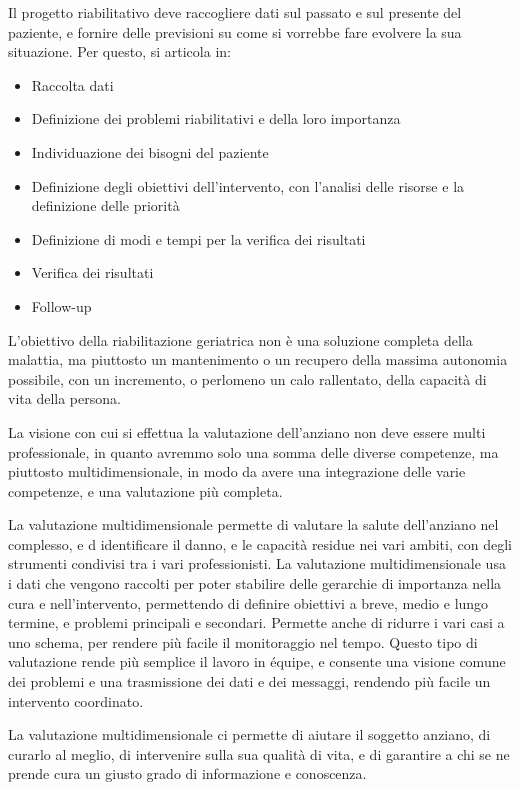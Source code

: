 Il progetto riabilitativo deve raccogliere dati sul passato e sul presente del
paziente, e fornire delle previsioni su come si vorrebbe fare evolvere la sua
situazione. Per questo, si articola in:
\begin{itemize}
\item Raccolta dati
\item Definizione dei problemi riabilitativi e della loro importanza
\item Individuazione dei bisogni del paziente
\item Definizione degli obiettivi dell'intervento, con l'analisi delle risorse
e la definizione delle priorità
\item Definizione di modi e tempi per la verifica dei risultati
\item Verifica dei risultati
\item Follow-up
\end{itemize}

L'obiettivo della riabilitazione geriatrica non è una soluzione completa della 
malattia, ma piuttosto un mantenimento o un recupero della massima autonomia
possibile, con un incremento, o perlomeno un calo rallentato, della capacità di
vita della persona.

La visione con cui si effettua la valutazione dell'anziano non deve essere multi
professionale, in quanto avremmo solo una somma delle diverse competenze, ma
piuttosto multidimensionale, in modo da avere una integrazione delle varie
competenze, e una valutazione più completa.

La valutazione multidimensionale permette di valutare la salute dell'anziano nel
complesso, e d identificare il danno, e le capacità residue nei vari ambiti, con
degli strumenti condivisi tra i vari professionisti.
La valutazione multidimensionale usa i dati che vengono raccolti per poter
stabilire delle gerarchie di importanza nella cura e nell'intervento,
permettendo di definire obiettivi a breve, medio e lungo termine, e problemi
principali e secondari. Permette anche di ridurre i vari casi a uno schema, per
rendere più facile il monitoraggio nel tempo.
Questo tipo di valutazione rende più semplice il lavoro in équipe, e consente
una visione comune dei problemi e una trasmissione dei dati e dei messaggi,
rendendo più facile un intervento coordinato.

La valutazione multidimensionale ci permette di aiutare il soggetto anziano, di
curarlo al meglio, di intervenire sulla sua qualità di vita, e di garantire a
chi se ne prende cura un giusto grado di informazione e conoscenza.

